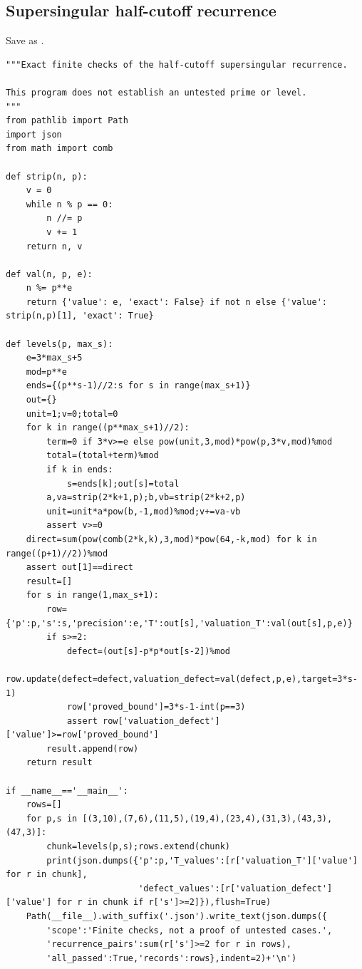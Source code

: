 \documentclass[11pt,a4paper]{article}
\begin{document}
\subsection{Supersingular half-cutoff recurrence}
Save as .
\begin{lstlisting}
"""Exact finite checks of the half-cutoff supersingular recurrence.

This program does not establish an untested prime or level.
"""
from pathlib import Path
import json
from math import comb

def strip(n, p):
    v = 0
    while n % p == 0:
        n //= p
        v += 1
    return n, v

def val(n, p, e):
    n %= p**e
    return {'value': e, 'exact': False} if not n else {'value': strip(n,p)[1], 'exact': True}

def levels(p, max_s):
    e=3*max_s+5
    mod=p**e
    ends={(p**s-1)//2:s for s in range(max_s+1)}
    out={}
    unit=1;v=0;total=0
    for k in range((p**max_s+1)//2):
        term=0 if 3*v>=e else pow(unit,3,mod)*pow(p,3*v,mod)%mod
        total=(total+term)%mod
        if k in ends:
            s=ends[k];out[s]=total
        a,va=strip(2*k+1,p);b,vb=strip(2*k+2,p)
        unit=unit*a*pow(b,-1,mod)%mod;v+=va-vb
        assert v>=0
    direct=sum(pow(comb(2*k,k),3,mod)*pow(64,-k,mod) for k in range((p+1)//2))%mod
    assert out[1]==direct
    result=[]
    for s in range(1,max_s+1):
        row={'p':p,'s':s,'precision':e,'T':out[s],'valuation_T':val(out[s],p,e)}
        if s>=2:
            defect=(out[s]-p*p*out[s-2])%mod
            row.update(defect=defect,valuation_defect=val(defect,p,e),target=3*s-1)
            row['proved_bound']=3*s-1-int(p==3)
            assert row['valuation_defect']['value']>=row['proved_bound']
        result.append(row)
    return result

if __name__=='__main__':
    rows=[]
    for p,s in [(3,10),(7,6),(11,5),(19,4),(23,4),(31,3),(43,3),(47,3)]:
        chunk=levels(p,s);rows.extend(chunk)
        print(json.dumps({'p':p,'T_values':[r['valuation_T']['value'] for r in chunk],
                          'defect_values':[r['valuation_defect']['value'] for r in chunk if r['s']>=2]}),flush=True)
    Path(__file__).with_suffix('.json').write_text(json.dumps({
        'scope':'Finite checks, not a proof of untested cases.',
        'recurrence_pairs':sum(r['s']>=2 for r in rows),
        'all_passed':True,'records':rows},indent=2)+'\n')

\end{lstlisting}
\end{document}
